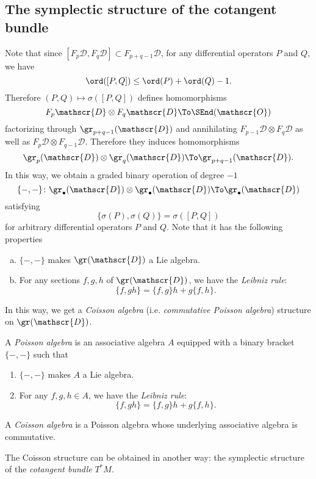 \subsection{The symplectic structure of the cotangent bundle}
Note that since $[F_p\mathscr{D},F_q\mathscr{D}]\subset F_{p+q-1}\mathscr{D}$, 
for any differential operators $P$ and $Q$, we have
\[
\ord([P,Q])\le\ord(P)+\ord(Q)-1.
\]
Therefore $(P,Q)\mapsto\sigma([P,Q])$ defines homomorphisms
\[
F_p\mathscr{D}\otimes F_q\mathscr{D}\To\SEnd(\mathscr{O})
\]
factorizing through $\gr_{p+q-1}(\mathscr{D})$ and 
annihilating $F_{p-1}\mathscr{D}\otimes F_q\mathscr{D}$ 
as well as $F_p\mathscr{D}\otimes F_{q-1}\mathscr{D}$. 
Therefore they induces homomorphisms
\[
\gr_{p}(\mathscr{D})\otimes\gr_{q}(\mathscr{D})\To\gr_{p+q-1}(\mathscr{D}).
\]
In this way, we obtain a graded binary operation of degree $-1$
\begin{equation}\label{eq:Poisson_Bracket}
\{-,-\}\colon
\gr_\bullet(\mathscr{D})\otimes\gr_\bullet(\mathscr{D})\To\gr_\bullet(\mathscr{D})
\end{equation}
satisfying
\[
\{\sigma(P),\sigma(Q)\}=\sigma([P,Q])
\]
for arbitrary differential operators $P$ and $Q$.
Note that it has the following properties
\begin{enumerate}[(a)]
\item $\{-,-\}$ makes $\gr(\mathscr{D})$ a Lie algebra.
\item For any sections $f,g,h$ of $\gr(\mathscr{D})$, 
we have the \emph{Leibniz rule}:
\[
\{f,gh\}=\{f,g\}h+g\{f,h\}.
\]
\end{enumerate}
In this way, we get a \emph{Coisson algebra} 
(i.e. \emph{commutative Poisson algebra})
structure on $\gr(\mathscr{D})$.
\begin{Rem}
A \emph{Poisson algebra} is an associative algebra $A$ 
equipped with a binary bracket $\{-,-\}$ such that 
\begin{enumerate}[(P1)]
\item $\{-,-\}$ makes $A$ a Lie algebra.
\item For any $f,g,h\in A$, 
we have the \emph{Leibniz rule}:
\[
\{f,gh\}=\{f,g\}h+g\{f,h\}.
\]
\end{enumerate}
A \emph{Coisson algebra} is a Poisson algebra 
whose underlying associative algebra is commutative.
\end{Rem}

The Coisson structure can be obtained in another way: 
the symplectic structure of the \emph{cotangent bundle} $T^{\ast}M$. 

